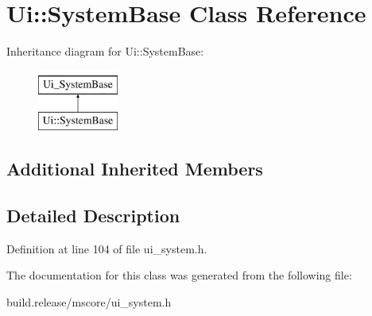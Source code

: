 \hypertarget{class_ui_1_1_system_base}{}\section{Ui\+:\+:System\+Base Class Reference}
\label{class_ui_1_1_system_base}
Inheritance diagram for Ui\+:\+:System\+Base\+:\begin{figure}[H]
\begin{center}
\leavevmode
\includegraphics[height=2.000000cm]{class_ui_1_1_system_base}
\end{center}
\end{figure}
\subsection*{Additional Inherited Members}


\subsection{Detailed Description}


Definition at line 104 of file ui\+\_\+system.\+h.



The documentation for this class was generated from the following file\+:\begin{DoxyCompactItemize}
\item 
build.\+release/mscore/ui\+\_\+system.\+h\end{DoxyCompactItemize}
